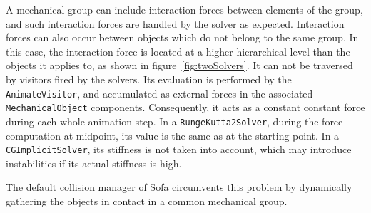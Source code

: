 A mechanical group can include interaction forces between elements of the group, and such interaction forces are handled by the solver as expected.
Interaction forces can also occur between objects which do not belong to the same group.
In this case, the interaction force is located at a higher hierarchical level than the objects it applies to, as shown in figure~\ref{fig:twoSolvers}.
It can not be traversed by visitors fired by the solvers.
Its evaluation is performed by the \texttt{AnimateVisitor}, and accumulated as external forces in the associated \texttt{MechanicalObject} components.
Consequently, it acts as a constant constant force during each whole animation step.
In a \texttt{RungeKutta2Solver}, during the force computation at midpoint, its value is the same as at the starting point.
In a \texttt{CGImplicitSolver}, its stiffness is not taken into account, which may introduce instabilities if its actual stiffness is high.

The default collision manager of Sofa circumvents this problem by dynamically gathering the objects in contact in a common mechanical group.

%
%
%

